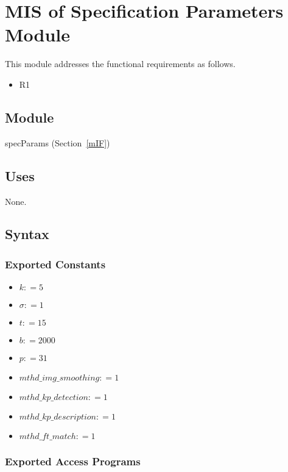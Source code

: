 \documentclass[12pt, titlepage]{article}
\begin{document}
\section{MIS of Specification Parameters Module} \label{mSP}
This module addresses the functional requirements as follows.
\begin{itemize}
  \item R1
\end{itemize}

\subsection{Module}
specParams (Section~\ref{mIF})

\subsection{Uses}
None.

\subsection{Syntax}

\subsubsection{Exported Constants}
\begin{itemize}
  \item $k: = 5$
  \item $\sigma: = 1$ 
  \item $t: = 15$ 
  \item $b: = 2000$ 
  \item $p: = 31$ 
  \item $mthd\_img\_smoothing: = 1$
  \item $mthd\_kp\_detection: = 1$ 
  \item $mthd\_kp\_description: = 1$
  \item $mthd\_ft\_match: = 1$
\end{itemize}
\subsubsection{Exported Access Programs}
\end{document}
